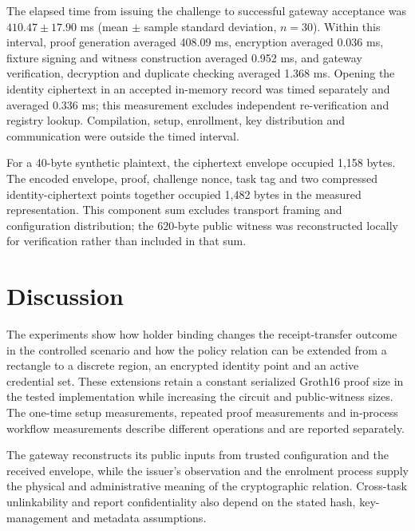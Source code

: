 \documentclass[pdflatex,iicol,sn-mathphys-num]{sn-jnl}
\begin{document}
The elapsed time from issuing the challenge to successful gateway acceptance was $410.47\pm17.90$ ms (mean $\pm$ sample standard deviation, $n=30$). Within this interval, proof generation averaged 408.09 ms, encryption averaged 0.036 ms, fixture signing and witness construction averaged 0.952 ms, and gateway verification, decryption and duplicate checking averaged 1.368 ms. Opening the identity ciphertext in an accepted in-memory record was timed separately and averaged 0.336 ms; this measurement excludes independent re-verification and registry lookup. Compilation, setup, enrollment, key distribution and communication were outside the timed interval.

For a 40-byte synthetic plaintext, the ciphertext envelope occupied 1,158 bytes. The encoded envelope, proof, challenge nonce, task tag and two compressed identity-ciphertext points together occupied 1,482 bytes in the measured representation. This component sum excludes transport framing and configuration distribution; the 620-byte public witness was reconstructed locally for verification rather than included in that sum.

\section{Discussion}
\label{sec:discussion}
The experiments show how holder binding changes the receipt-transfer outcome in the controlled scenario and how the policy relation can be extended from a rectangle to a discrete region, an encrypted identity point and an active credential set. These extensions retain a constant serialized Groth16 proof size in the tested implementation while increasing the circuit and public-witness sizes. The one-time setup measurements, repeated proof measurements and in-process workflow measurements describe different operations and are reported separately.

The gateway reconstructs its public inputs from trusted configuration and the received envelope, while the issuer's observation and the enrolment process supply the physical and administrative meaning of the cryptographic relation. Cross-task unlinkability and report confidentiality also depend on the stated hash, key-management and metadata assumptions.
\end{document}
